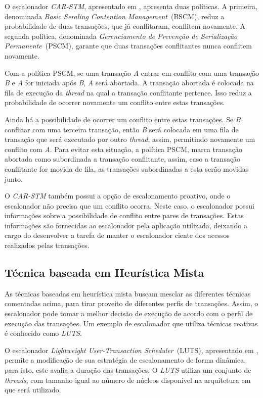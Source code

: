 \documentclass[ti]{texufpel}
\begin{document}
O escalonador \emph{CAR-STM}, apresentado em \cite{dolev08}, apresenta duas políticas. A primeira, denominada \emph{Basic Seraling Contention Management}~(BSCM), reduz a probabilidade de duas transações, que já conflitaram, conflitem novamente. A segunda política, denominada \emph{Gerenciamento de Prevenção de Serialização Permanente}~(PSCM), garante que duas transações conflitantes nunca conflitem novamente.

Com a política PSCM, se uma transação \emph{A} entrar em conflito com uma transação \emph{B} e \emph{A} for iniciada após \emph{B}, \emph{A} será abortada. A transação abortada é colocada na fila de execução da \emph{thread} na qual a transação conflitante pertence. Isso reduz a probabilidade de ocorrer novamente um conflito entre estas transações.

Ainda há a possibilidade de ocorrer um conflito entre estas transações. Se \emph{B} conflitar com uma terceira transação, então \emph{B} será colocada em uma fila de transação que será executado por outro \emph{thread}, assim, permitindo novamente um conflito com \emph{A}. Para evitar esta situação, a política PSCM, marca transação abortada como subordinada a transação conflitante, assim, caso a transação conflitante for movida de fila, as transações subordinadas a esta serão movidas junto.

O \emph{CAR-STM} também possui a opção de escalonamento proativo, onde o escalonador não precisa que um conflito ocorra. Neste caso, o escalonador possui informações sobre a possibilidade de conflito entre pares de transações. Estas informações são fornecidas ao escalonador pela aplicação utilizada, deixando a cargo do desenvolver a tarefa de manter o escalonador ciente dos acessos realizados pelas transações.

\subsection{Técnica baseada em Heurística Mista}

As técnicas baseadas em heurística mista buscam mesclar as diferentes técnicas comentadas acima, para tirar proveito de diferentes perfis de transações. Assim, o escalonador pode tomar a melhor decisão de execução de acordo com o perfil de execução das transações.  Um exemplo de escalonador que utiliza técnicas reativas é conhecido como \emph{LUTS}.

O escalonador \emph{Lightweight User-Transaction Scheduler}~(LUTS), apresentado em \cite{nicacio13}, permite a modificação de sua estratégia de escalonamento de forma dinâmica, para isto, este avalia a duração das transações. O \emph{LUTS} utiliza um conjunto de \emph{threads}, com tamanho igual ao número de núcleos disponivel na arquitetura em que será utilizado.
\end{document}
